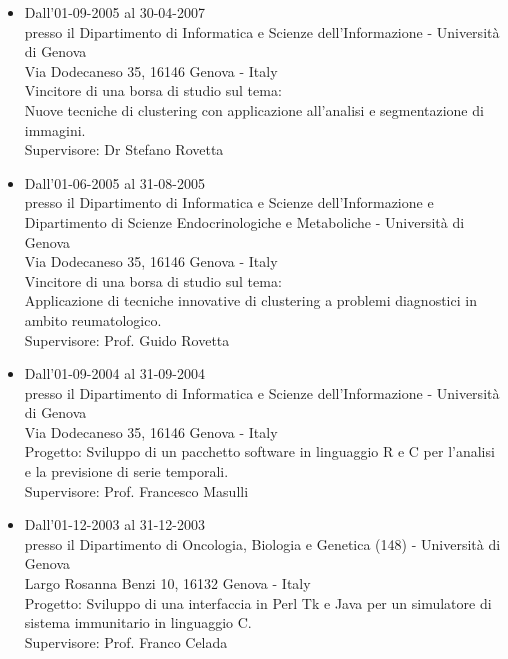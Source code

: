 \documentclass[a4paper,10pt]{article}
\begin{document}
\begin{itemize}
\item Dall'01-09-2005 al 30-04-2007 \\
  presso il Dipartimento di Informatica e Scienze dell'Informazione - Universit\`a di Genova \\
  Via Dodecaneso 35, 16146 Genova - Italy \\
  Vincitore di una borsa di studio sul tema: \\
  Nuove tecniche di clustering con applicazione all'analisi e segmentazione di immagini. \\
  Supervisore: Dr Stefano Rovetta

\item Dall'01-06-2005 al 31-08-2005 \\
  presso il Dipartimento di Informatica e Scienze dell'Informazione e Dipartimento di Scienze Endocrinologiche e Metaboliche - Universit\`a di Genova \\
  Via Dodecaneso 35, 16146 Genova - Italy \\
  Vincitore di una borsa di studio sul tema: \\
  Applicazione di tecniche innovative di clustering a problemi diagnostici in ambito reumatologico. \\
  Supervisore: Prof. Guido Rovetta

\item Dall'01-09-2004 al 31-09-2004 \\
  presso il Dipartimento di Informatica e Scienze dell'Informazione - Universit\`a di Genova \\
  Via Dodecaneso 35, 16146 Genova - Italy \\
  Progetto:
  Sviluppo di un pacchetto software in linguaggio R e C per l'analisi e la previsione di serie temporali. \\
  Supervisore: Prof. Francesco Masulli

\item Dall'01-12-2003 al 31-12-2003 \\
  presso il Dipartimento di Oncologia, Biologia e Genetica (148) - Universit\`a di Genova \\
  Largo Rosanna Benzi 10, 16132 Genova - Italy \\
  Progetto:
  Sviluppo di una interfaccia in Perl Tk e Java per un simulatore di sistema immunitario in linguaggio C. \\
  Supervisore: Prof. Franco Celada

\end{itemize}
\end{document}
